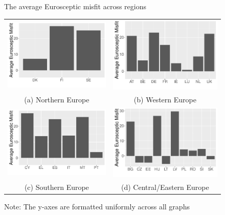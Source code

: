 \begin{figure}
	\caption{The average Eurosceptic misfit across regions}
	\label{fig: Misfit Regions}
\begin{tabular}{cc}
	\includegraphics[width=65mm]{../../Analysis/Graphs/NE} & \includegraphics[width=65mm]{../../Analysis/Graphs/WE} \\
	(a) Northern Europe & (b) Western Europe \\[8pt]
	\includegraphics[width=65mm]{../../Analysis/Graphs/SE} & \includegraphics[width=65mm]{../../Analysis/Graphs/CEE} \\
	(c) Southern Europe & (d) Central/Eastern Europe \\[8pt]	
\end{tabular}
\caption*{Note: The y-axes are formatted uniformly across all graphs}	
\end{figure}

